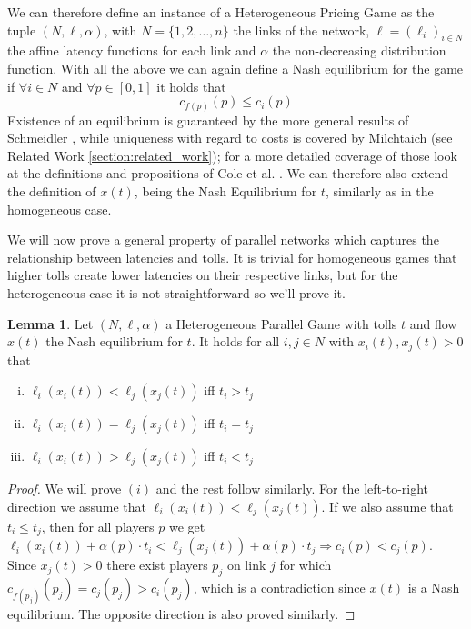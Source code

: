 \documentclass[10pt,a4paper]{book}
\theoremstyle{definition}
\newtheorem{lemma}[definition]{Lemma}
\theoremstyle{comment}
\begin{document}
We can therefore define an instance of a Heterogeneous Pricing Game as the tuple $(N, \ell, \alpha)$, with $N = \{1, 2, \dots, n\}$ the links of the network, $\ell = (\ell_i)_{i \in N}$ the affine latency functions for each link and $\alpha$ the non-decreasing distribution function.
With all the above we can again define a Nash equilibrium for the game if $\forall i \in N$ and $\forall p \in [0, 1]$ it holds that
\[c_{f(p)}(p) \leq c_i(p)\]
Existence of an equilibrium is guaranteed by the more general results of Schmeidler \cite[Thm 2]{1973JSP.....7..295S}, while uniqueness with regard to costs is covered by Milchtaich \cite[Prop 3.3]{doi:10.1287/moor.25.3.349.12220} (see Related Work \ref{section:related_work}); for a more detailed coverage of those look at the definitions and propositions of Cole et al. \cite[\S2]{10.1145/780542.780618}.
We can therefore also extend the definition of $x(t)$, being the Nash Equilibrium for $t$, similarly as in the homogeneous case.

We will now prove a general property of parallel networks which captures the relationship between latencies and tolls.
It is trivial for homogeneous games that higher tolls create lower latencies on their respective links, but for the heterogeneous case it is not straightforward so we'll prove it.

\begin{lemma}
	\label{lemma:latencies_tolls}
	Let $(N, \ell, \alpha)$ a Heterogeneous Parallel Game with tolls $t$ and flow $x(t)$ the Nash equilibrium for $t$.
	It holds for all $i, j \in N$ with $x_i(t), x_j(t) > 0$ that
	\begin{enumerate}[(i)]
		\item $\ell_i(x_i(t)) < \ell_j(x_j(t))$ iff $t_i > t_j$
		\item $\ell_i(x_i(t)) = \ell_j(x_j(t))$ iff $t_i = t_j$
		\item $\ell_i(x_i(t)) > \ell_j(x_j(t))$ iff $t_i < t_j$
	\end{enumerate}
\end{lemma}

\begin{proof}
	We will prove $(i)$ and the rest follow similarly.
	For the left-to-right direction we assume that $\ell_i(x_i(t)) < \ell_j(x_j(t))$.
	If we also assume that $t_i \le t_j$, then for all players $p$ we get $\ell_i(x_i(t)) + \alpha(p) \cdot t_i < \ell_j(x_j(t)) + \alpha(p) \cdot t_j \Rightarrow c_i(p) < c_j(p)$.
	Since $x_j(t) > 0$ there exist players $p_j$ on link $j$ for which $c_{f(p_j)}(p_j) = c_j(p_j) > c_i(p_j)$, which is a contradiction since $x(t)$ is a Nash equilibrium.
	The opposite direction is also proved similarly.
\end{proof}
\end{document}
